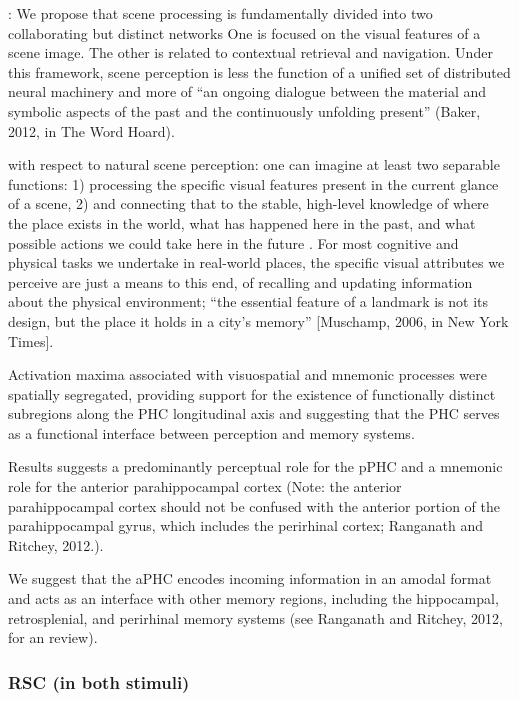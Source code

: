 \documentclass[english]{article}
\begin{document}
%
\citep{baldassano2016two}: We propose that scene processing is fundamentally
divided into two collaborating but distinct networks
%
One is focused on the visual features of a scene image. The other is related to
contextual retrieval and navigation.
%
Under this framework, scene perception is less the function of a unified set of
distributed neural machinery and more of ``an ongoing dialogue between the
material and symbolic aspects of the past and the continuously unfolding
present'' (Baker, 2012, in The Word Hoard).

%
\citep{baldassano2016two} with respect to natural scene perception: one can
imagine at least two separable functions:
%
1) processing the specific visual features present in the current glance of a
scene,
%
2) and connecting that to the stable, high-level knowledge of where the place
exists in the world, what has happened here in the past, and what possible
actions we could take here in the future \citep{baldassano2016two}.
%
For most cognitive and physical tasks we undertake in real-world places, the
specific visual attributes we perceive are just a means to this end, of
recalling and updating information about the physical environment; ``the
essential feature of a landmark is not its design, but the place it holds in a
city’s memory'' [Muschamp, 2006, in New York Times]\citep{baldassano2016two}.

%
Activation maxima associated with visuospatial and mnemonic
processes were spatially segregated, providing support for the existence of
functionally distinct subregions along the PHC longitudinal axis and suggesting
that the PHC serves as a functional interface between perception and memory
systems\citep{baumann2016functional}.

Results suggests a predominantly perceptual role for the pPHC and a mnemonic
role for the anterior parahippocampal cortex (Note: the anterior parahippocampal
cortex should not be confused with the anterior portion of the parahippocampal
gyrus, which includes the perirhinal cortex; Ranganath and Ritchey,
2012.)\citep{baumann2016functional}.

We suggest that the aPHC encodes incoming information in an amodal format and
acts as an interface with other memory regions, including the hippocampal,
retrosplenial, and perirhinal memory systems (see Ranganath and Ritchey, 2012,
for an review)\citep{baumann2016functional}.



\subsubsection{RSC (in both stimuli)}
\end{document}
